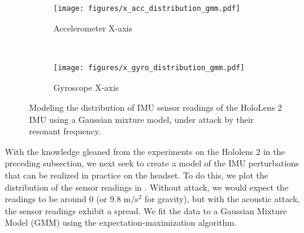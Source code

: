 \begin{figure}[h]
    \centering
        \begin{subfigure}[b]{0.22\textwidth}
            \centering
            \texttt{[image: figures/x\_acc\_distribution\_gmm.pdf]}
            \caption{Accelerometer X-axis}
            \label{subfig:right_distribution_1}
        \end{subfigure}
        ~
        \begin{subfigure}[b]{0.22\textwidth}
            \centering
            \texttt{[image: figures/x\_gyro\_distribution\_gmm.pdf]}
            \caption{Gyroscope X-axis}
            \label{subfig:right_distribution_4}
        \end{subfigure} 
    \caption{Modeling the distribution of IMU sensor readings of the HoloLens 2 IMU using a Gaussian mixture model, under attack by their resonant frequency.}
    \label{fig:right_distribution}
\end{figure}
With the knowledge gleaned from the experiments on the Hololens 2 in the preceding subsection, we next seek to create a model of the IMU perturbations that can be realized in practice on the headset.
To do this, we plot the distribution of the sensor readings in .
Without attack, we would expect the readings to be around 0 (or 9.8 m/s$^2$ for gravity), but with the acoustic attack, the sensor readings exhibit a spread.
We fit the data to a Gaussian Mixture Model (GMM) using the expectation-maximization algorithm.



